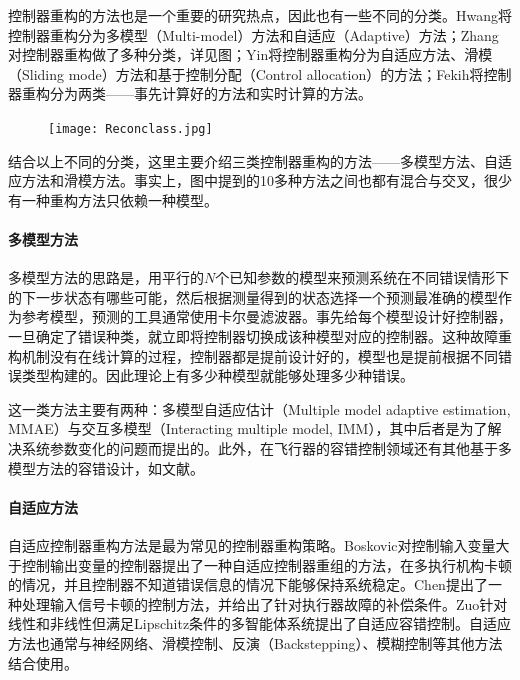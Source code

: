 控制器重构的方法也是一个重要的研究热点，因此也有一些不同的分类。Hwang\cite{5282515}将控制器重构分为多模型（Multi-model）方法和自适应（Adaptive）方法；Zhang\cite{Zhang2008229}对控制器重构做了多种分类，详见图；Yin\cite{7407616}将控制器重构分为自适应方法、滑模（Sliding mode）方法和基于控制分配（Control allocation）的方法；Fekih\cite{6859271}将控制器重构分为两类——事先计算好的方法和实时计算的方法。
\begin{figure}
    \centering
    \texttt{[image: Reconclass.jpg]}
\end{figure}
结合以上不同的分类，这里主要介绍三类控制器重构的方法——多模型方法、自适应方法和滑模方法。事实上，图中提到的10多种方法之间也都有混合与交叉，很少有一种重构方法只依赖一种模型\cite{Zhang2008229}。

\paragraph*{多模型方法}
多模型方法的思路是，用平行的$N$个已知参数的模型来预测系统在不同错误情形下的下一步状态有哪些可能，然后根据测量得到的状态选择一个预测最准确的模型作为参考模型，预测的工具通常使用卡尔曼滤波器。事先给每个模型设计好控制器，一旦确定了错误种类，就立即将控制器切换成该种模型对应的控制器。这种故障重构机制没有在线计算的过程，控制器都是提前设计好的，模型也是提前根据不同错误类型构建的。因此理论上有多少种模型就能够处理多少种错误。

这一类方法主要有两种\cite{5282515}：多模型自适应估计（Multiple model adaptive estimation, MMAE）\cite{81428,70412}与交互多模型（Interacting multiple model, IMM）\cite{976961,827910}，其中后者是为了解决系统参数变化的问题而提出的。此外，在飞行器的容错控制领域还有其他基于多模型方法的容错设计，如文献\cite{827910,786187,JUNG2005115}。

\paragraph*{自适应方法}
自适应控制器重构方法\cite{1709933,6670789,7353144}是最为常见的控制器重构策略。Boskovic\cite{703075}对控制输入变量大于控制输出变量的控制器提出了一种自适应控制器重组的方法，在多执行机构卡顿的情况，并且控制器不知道错误信息的情况下能够保持系统稳定。Chen\cite{989090}提出了一种处理输入信号卡顿的控制方法，并给出了针对执行器故障的补偿条件。Zuo\cite{6945860}针对线性和非线性但满足Lipschitz条件的多智能体系统提出了自适应容错控制。自适应方法也通常与神经网络\cite{6060930,Lin2017}、滑模控制\cite{6060930,7506323}、反演（Backstepping）\cite{Li2016177,Jiang201057}、模糊控制\cite{Zou201110}等其他方法结合使用。


